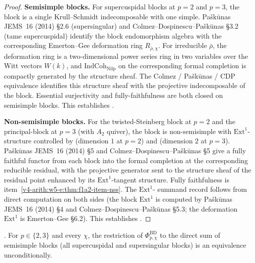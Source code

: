 \begin{proof}
\textbf{Semisimple blocks.} For supercuspidal blocks at \(p=2\) and
\(p=3\), the block is a single Krull--Schmidt indecomposable with
one simple. Pa{\v s}k{\=u}nas JEMS~16 (2014) \S 2.6 (supersingular) and
Colmez--Dospinescu--Pa{\v s}k{\=u}nas \S 3.2 (tame supercuspidal)
identify the block endomorphism algebra with the corresponding
Emerton--Gee deformation ring
\(R_{\bar\rho,\chi}\). For irreducible \(\bar\rho\), the deformation
ring is a two-dimensional power series ring in two variables over
the Witt vectors
\(W(k)\), and \(\mathrm{IndCoh}_{\mathrm{Nilp}}\) on the
corresponding formal completion is compactly generated by the
structure sheaf. The Colmez / Pa{\v s}k{\=u}nas / CDP equivalence
identifies this structure sheaf with the projective indecomposable
of the block. Essential surjectivity and fully-faithfulness are
both closed on semisimple blocks. This establishes
.

\textbf{Non-semisimple blocks.} For the twisted-Steinberg block at
\(p=2\) and the principal-block at \(p=3\) (with \(A_{2}\) quiver), the
block is non-semisimple with \(\mathrm{Ext}^{1}\)-structure
controlled by
 (dimension \(1\) at
\(p=2\)) and 
(dimension \(2\) at \(p=3\)). Pa{\v s}k{\=u}nas JEMS~16 (2014) \S 5 and
Colmez--Dospinescu--Pa{\v s}k{\=u}nas \S 5 give a fully faithful
functor from each block into the formal completion at the
corresponding reducible residual, with the projective generator
sent to the structure sheaf of the residual point enhanced by its
\(\mathrm{Ext}^{1}\)-tangent structure. Fully faithfulness is
item~\ref{v4-arith:w5-e:thm:f1a2-item-nss}. The \(\mathrm{Ext}^{1}\)-
summand record follows from direct computation on both sides (the
block \(\mathrm{Ext}^{1}\) is computed by Pa{\v s}k{\=u}nas JEMS~16 (2014) \S 4
and Colmez--Dospinescu--Pa{\v s}k{\=u}nas \S 5.3; the deformation
\(\mathrm{Ext}^{1}\) is Emerton--Gee \S 6.2). This establishes
.
\end{proof}

\begin{corollary}
\label{v4-arith:w5-e:cor:f1a2-ss-uncond}
\ClaimStatusProvedHere. For \(p\in\{2,3\}\) and every \(\chi\), the
restriction of \(\Phi^{\mathrm{BD}}_{p,\chi}\) to the direct sum of
semisimple blocks (all supercuspidal and supersingular blocks) is an
equivalence unconditionally.
\end{corollary}

